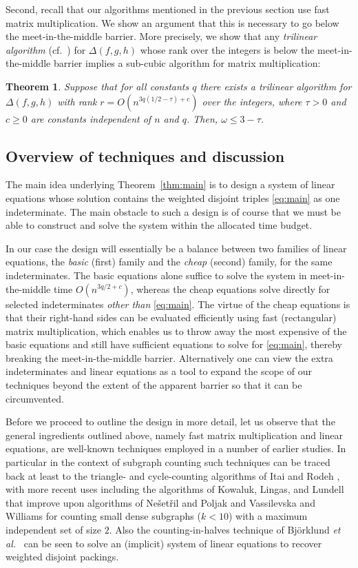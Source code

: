 \documentclass{amsart}
\newtheorem{Thm}{Theorem}
\begin{document}
Second, recall that our algorithms mentioned in the previous section use fast matrix multiplication. 
We show an argument that this is necessary to go below the meet-in-the-middle barrier.
More precisely, we show that any {\em trilinear algorithm} (cf.~\cite[\S9]{Pan1984})
for $\Delta(f,g,h)$ whose rank over the integers is below the 
meet-in-the-middle barrier implies a sub-cubic algorithm for matrix 
multiplication:

\begin{Thm}
\label{thm:omega-tau}
Suppose that for all constants $q$ there exists
a trilinear algorithm for $\Delta(f,g,h)$ with 
rank $r=O(n^{3q(1/2-\tau)+c})$ over the integers,
where $\tau>0$ and $c\geq 0$ are constants 
independent of $n$ and $q$. 
Then, $\omega\leq 3-\tau$.
\end{Thm}

\subsection{Overview of techniques and discussion}

The main idea underlying Theorem~\ref{thm:main} is to design
a system of linear equations whose solution contains the weighted 
disjoint triples \eqref{eq:main} as one indeterminate. The main obstacle
to such a design is of course that we must be able to construct 
and solve the system within the allocated time budget.

In our case the design will essentially be a balance between
two families of linear equations, the {\em basic} (first) family and
the {\em cheap} (second) family, for the same indeterminates. The basic 
equations alone suffice to solve 
the system in meet-in-the-middle time $O(n^{3q/2+c})$, whereas
the cheap equations solve directly for selected indeterminates 
{\em other than} \eqref{eq:main}. The virtue of the cheap equations 
is that their right-hand sides can be evaluated efficiently using 
fast (rectangular) matrix multiplication, which enables us to throw 
away the most expensive of the basic equations and still have sufficient 
equations to solve for \eqref{eq:main}, thereby breaking the 
meet-in-the-middle barrier. Alternatively one can view the 
extra indeterminates and linear equations as a tool to expand
the scope of our techniques beyond the extent of the apparent 
barrier so that it can be circumvented.

Before we proceed to outline the design in more detail, let us observe
that the general ingredients outlined above, namely fast matrix multiplication
and linear equations, are well-known techniques employed in a number of
earlier studies. In particular in the context of subgraph counting 
such techniques can be traced back at least to the triangle- and 
cycle-counting algorithms of Itai and Rodeh \cite{IR78}, with more recent 
uses including the algorithms of Kowaluk, Lingas, and Lundell~\cite{KLL}
that improve upon algorithms of 
Ne\v{s}et\v{r}il and Poljak \cite{NP85}
and 
Vassilevska and Williams \cite{VW09} 
for counting small dense subgraphs 
($k<10$) with a maximum independent set of size $2$. 
Also the counting-in-halves technique of 
Bj\"orklund {\em et al.}~\cite{BHKK09} can be seen to solve an 
(implicit) system of linear equations to recover weighted disjoint 
packings.
\end{document}
